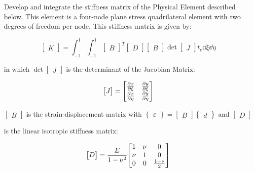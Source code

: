\documentclass[../main.tex]{subfiles}
\begin{document}
Develop and integrate the stiffness matrix of the Physical Element described below.
This element is a four-node plane stress quadrilateral element with two degrees of freedom per node.
This stiffness matrix is given by:

\[
    \begin{bmatrix}
        K
    \end{bmatrix}
    =
    \int_{-1}^{1} \int_{-1}^{1}
    \begin{bmatrix}
        B
    \end{bmatrix}^T
    \begin{bmatrix}
        D
    \end{bmatrix}
    \begin{bmatrix}
        B
    \end{bmatrix}
    \det
    \begin{bmatrix}
        J
    \end{bmatrix} 
    t_e
    \dd \xi
    \dd \eta
\]

in which \(\det    
\begin{bmatrix}
    J
\end{bmatrix}
\) is the determinant of the Jacobian Matrix:

\[
    \begin{bmatrix}
        J
    \end{bmatrix}    
    =
    \mqty[
        \pdv{x}{\xi} & \pdv{y}{\xi} \\
        \pdv{x}{\eta} & \pdv{y}{\eta}
    ]
\]

\(\begin{bmatrix}
    B
\end{bmatrix}\) is the strain-displacement matrix with
\(\begin{Bmatrix}
    \varepsilon
\end{Bmatrix}
=
\begin{bmatrix}
    B
\end{bmatrix}
\begin{Bmatrix}
    d
\end{Bmatrix}
    \) 
and     
\(\begin{bmatrix}D\end{bmatrix}\) 

is the linear isotropic stiffness matrix:

\[
    \begin{bmatrix}
        D
    \end{bmatrix}
    =
    \frac{E}{1-\nu^2}
    \mqty[
        1 & \nu & 0 \\
        \nu & 1 & 0\\
        0 & 0 & \frac{1-\nu}{2}
    ]
\]
\end{document}
